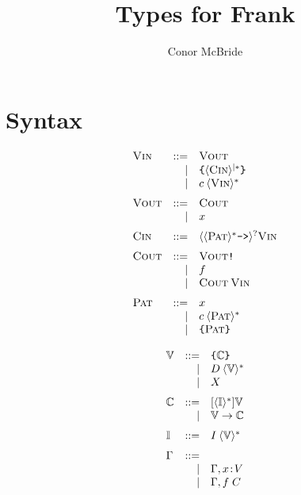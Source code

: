 \documentclass{article}
\begin{document}
\title{Types for Frank}
\author{Conor McBride}
\maketitle

\section{Syntax}


\newcommand{\gb}[2]{\langle #1 \rangle^{#2}}
\newcommand{\vin}{\textsc{Vin}}
\newcommand{\vout}{\textsc{Vout}}
\newcommand{\cin}{\textsc{Cin}}
\newcommand{\cout}{\textsc{Cout}}
\newcommand{\pat}{\textsc{Pat}}

\newcommand{\arr}{\mathbin{\texttt{->}}}
\newcommand{\bang}{\texttt{!}}
\newcommand{\sus}[1]{\texttt{\{} #1 \texttt{\}}}

\[\begin{array}{lrl}
\vin & ::= & \vout \\
     &   | & \sus{\gb{\cin}{|*}} \\
     &   | & c\:\gb{\vin}{*}
\medskip\\

\vout & ::= & \cout \\
      &   | & x
\medskip\\

\cin & ::= & \gb{\gb{\pat}{*}\arr}{?}\vin
\medskip\\

\cout & ::= & \vout \bang \\
      &   | & f \\
      &   | & \cout\:\vin
 \medskip \\

\pat & ::= & x \\
     &   | & c\:\gb{\pat}{*} \\
     &   | & \sus{\pat}
\end{array}\]

\newcommand{\VT}{\mathbb{V}}
\newcommand{\CT}{\mathbb{C}}
\newcommand{\IT}{\mathbb{I}}
\newcommand{\isc}{\!:\!}
\newcommand{\doesc}{\;}

\[\begin{array}{lrl}
\VT & ::= & \sus{\CT} \\
    &   | & D\:\gb{\VT}{*} \\
    &   | & X
\medskip\\

\CT & ::= & [\gb{\IT}{*}]\VT \\
    &   | & \VT \to \CT
\medskip\\

\IT & ::= & I\:\gb{\VT}{*}
 \medskip\\

\Gamma & ::= & \\
       &   | & \Gamma, x \isc V \\
       &   | & \Gamma, f \doesc C\\
\end{array}\]
\end{document}
